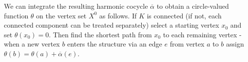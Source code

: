 We can integrate the resulting harmonic cocycle $\overline{\alpha}$ to obtain a circle-valued function $\theta$ on the vertex set $X^0$ as follows.
If $K$ is connected (if not, each connected component can be treated separately) select a starting vertex $x_0$ and set $\theta(x_0) = 0$.
Then find the shortest path from $x_0$ to each remaining vertex - when a new vertex $b$ enters the structure via an edge $e$ from vertex $a$ to $b$ assign $\theta(b) = \theta(a) + \overline{\alpha}(e)$.




